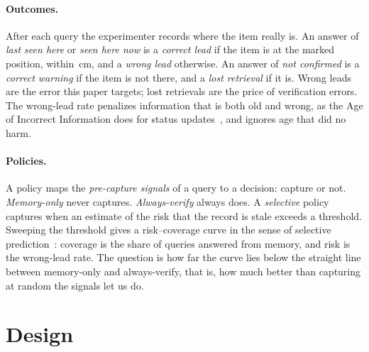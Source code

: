 \documentclass[sigconf,10pt]{acmart}
\begin{document}
\paragraph{Outcomes.}
After each query the experimenter records where the item really is.
An answer of \emph{last seen here} or \emph{seen here now} is a \emph{correct lead} if the item is
at the marked position, within \RPresentCm{}\,cm, and a \emph{wrong lead} otherwise.
An answer of \emph{not confirmed} is a \emph{correct warning} if the item is not there, and a
\emph{lost retrieval} if it is.
Wrong leads are the error this paper targets; lost retrievals are the price of verification
errors.
The wrong-lead rate penalizes information that is both old and wrong, as the Age of Incorrect
Information does for status updates~\cite{maatouk2020age}, and ignores age that did no harm.

\paragraph{Policies.}
A policy maps the \emph{pre-capture signals} of a query to a decision: capture or not.
\emph{Memory-only} never captures.
\emph{Always-verify} always does.
A \emph{selective} policy captures when an estimate of the risk that the record is stale exceeds a
threshold.
Sweeping the threshold gives a risk--coverage curve in the sense of selective
prediction~\cite{geifman2017selective}: coverage is the share of queries answered from memory, and
risk is the wrong-lead rate.
The question is how far the curve lies below the straight line between memory-only and
always-verify, that is, how much better than capturing at random the signals let us do.

\section{Design}
\label{sec:design}
\end{document}
